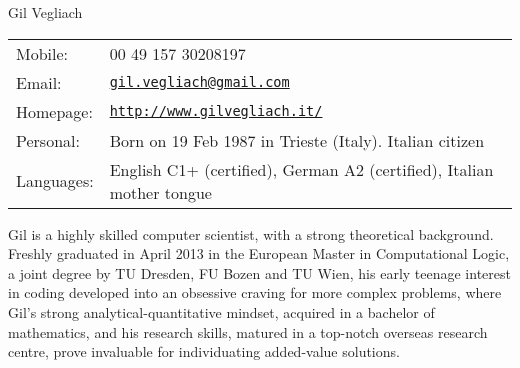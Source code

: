 \documentclass[letterpaper]{article}
\def\name{Gil Vegliach}
\renewenvironment{itemize}{
  \begin{list}{}{
    \setlength{\leftmargin}{1.5em}
  }
}{
  \end{list}
}
\begin{document}
{\huge \name}


\vspace{0.25in}

\begin{minipage}{0.45\linewidth}
  \begin{tabular}{ll}
    Mobile: & 00 49 157 30208197 \\
    Email: & \href{mailto:gil.vegliach@gmail.com}{\tt gil.vegliach@gmail.com} \\
    Homepage: & \href{http://www.gilvegliach.it/}{\tt http://www.gilvegliach.it/} \\
    Personal: & Born on 19 Feb 1987 in Trieste (Italy). Italian citizen\\
    Languages: & English C1+ (certified), German A2 (certified), Italian mother tongue
  \end{tabular}
\end{minipage}

\bigskip
Gil is a highly skilled computer scientist, with a strong theoretical background. Freshly graduated in April 2013 in the European Master in Computational Logic, a joint degree by TU Dresden, FU Bozen and TU Wien, his early teenage interest in coding developed into an obsessive craving for more complex problems, where 
Gil's strong analytical-quantitative mindset, acquired in a bachelor of mathematics, and his research skills, matured in a top-notch overseas research centre, prove invaluable for individuating added-value solutions. 

\end{document}
